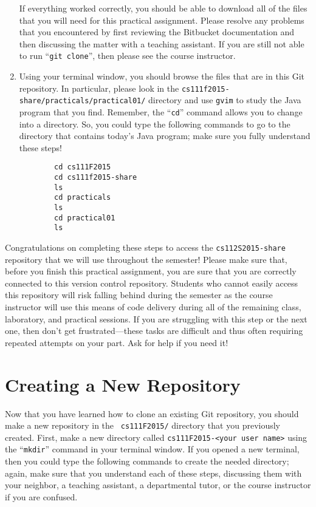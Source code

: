 \begin{enumerate}
    If everything worked correctly, you should be able to download all of the files that you will need for this
    practical assignment. Please resolve any problems that you encountered by first reviewing the Bitbucket
    documentation and then discussing the matter with a teaching assistant.  If you are still not able to run ``{\tt git
      clone}'', then please see the course instructor.

  \item Using your terminal window, you should browse the files that are in this Git repository.  In particular, please
    look in the {\tt cs111f2015-share/practicals/practical01/} directory and use {\tt gvim} to study the Java program that
    you find.  Remember, the ``{\tt cd}'' command allows you to change into a directory. So, you could type the following
    commands to go to the directory that contains today's Java program; make sure you fully understand these steps!

    \vspace*{-.1in}
    \begin{verbatim}
        cd cs111F2015
        cd cs111f2015-share
        ls
        cd practicals
        ls
        cd practical01
        ls
    \end{verbatim}
    \vspace*{-.5in}

    \end{enumerate}

    Congratulations on completing these steps to access the {\tt cs112S2015-share} repository that we will use
    throughout the semester! Please make sure that, before you finish this practical assignment, you are sure that you
    are correctly connected to this version control repository. Students who cannot easily access this repository will
    risk falling behind during the semester as the course instructor will use this means of code delivery during all of
    the remaining class, laboratory, and practical sessions. If you are struggling with this step or the next one, then
    don't get frustrated---these tasks are difficult and thus often requiring repeated attempts on your part. Ask for
    help if you need it!

\section*{Creating a New Repository}

Now that you have learned how to clone an existing Git repository, you should make a new repository in the {\tt
cs111F2015/} directory that you previously created.  First, make a new directory called {\tt cs111F2015-<your user
name>} using the ``{\tt mkdir}'' command in your terminal window. If you opened a new terminal, then you could type the
following commands to create the needed directory; again, make sure that you understand each of these steps, discussing
them with your neighbor, a teaching assistant, a departmental tutor, or the course instructor if you are confused.

